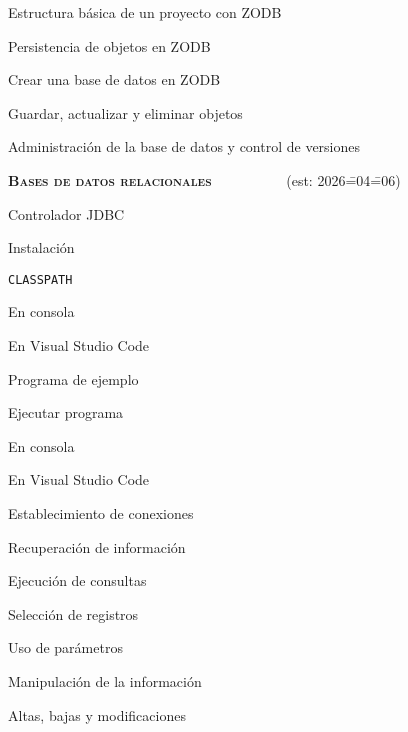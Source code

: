 \begin{longenum}
\begin{longenum}
\begin{longenum}
            \begin{longenum}
                \item Estructura básica de un proyecto con ZODB
            \end{longenum}
            \item Persistencia de objetos en ZODB
            \begin{longenum}
                \item Crear una base de datos en ZODB
                \item Guardar, actualizar y eliminar objetos
                \item Administración de la base de datos y control de versiones
            \end{longenum}
        \end{longenum}
    \end{longenum}
    \item \textbf{\textsc{Bases de datos relacionales}} \ \ \ \ \ \ \ \dual\ \ \ (est: 2026\==04\==06)
    \begin{longenum}
        \item Controlador JDBC
        \begin{longenum}
            \item Instalación
            \item \texttt{CLASSPATH}
            \begin{longenum}
                \item En consola
                \item En Visual Studio Code
            \end{longenum}
        \end{longenum}
        \item Programa de ejemplo
        \item Ejecutar programa
        \begin{longenum}
            \item En consola
            \item En Visual Studio Code
        \end{longenum}
        \item Establecimiento de conexiones
        \item Recuperación de información
        \begin{longenum}
            \item Ejecución de consultas
            \item Selección de registros
            \item Uso de parámetros
        \end{longenum}
        \item Manipulación de la información
        \begin{longenum}
            \item Altas, bajas y modificaciones
        \end{longenum}
    \end{longenum}
\end{longenum}

